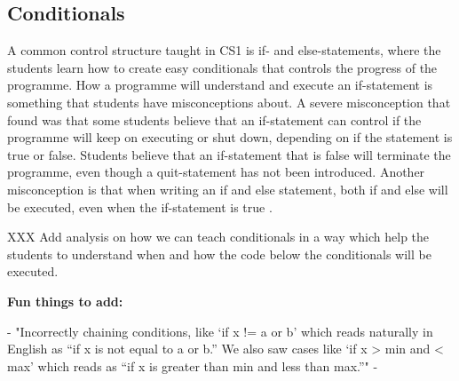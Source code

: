 \subsection{Conditionals}

A common control structure taught in CS1 is if- and else-statements, where the students learn how to create easy conditionals that controls the progress of the programme. How a programme will understand and execute an if-statement is something that students have misconceptions about. A severe misconception that \textcite{Plass2015Variables} found was that some students believe that an if-statement can control if the programme will keep on executing or shut down, depending on if the statement is true or false. Students believe that an if-statement that is false will terminate the programme, even though a quit-statement has not been introduced. Another misconception is that when writing an if and else statement, both if and else will be executed, even when the if-statement is true \parencite{MisconceptionsSurvey2017}.

XXX Add analysis on how we can teach conditionals in a way which help the students to understand when and how the code below the conditionals will be executed.


\textbf{Fun things to add:}

- "Incorrectly chaining conditions, like ‘if x != a or b’ which reads naturally in English as “if x is not equal to a or b.” We also saw cases like ‘if x > min and < max’ which reads as “if x is greater than min and less than max.”" - \parencite{GuoMarkelZhang2020}